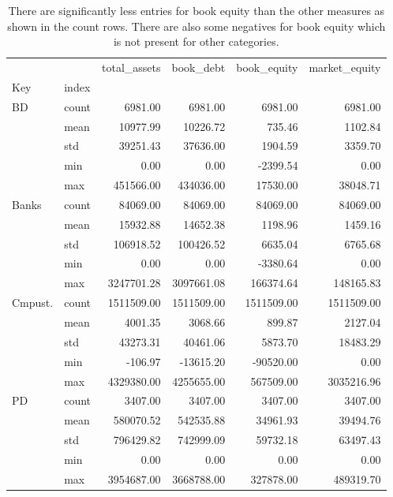 \begin{table}
\caption{There are significantly less entries for book equity than the other measures as shown in the count rows. There are also some negatives for book equity which is not present for other categories. }
\label{tab:Table 2.1}
\begin{tabular}{llrrrr}
\toprule
 &  & total_assets & book_debt & book_equity & market_equity \\
Key & index &  &  &  &  \\
\midrule
{BD} & count & 6981.00 & 6981.00 & 6981.00 & 6981.00 \\
 & mean & 10977.99 & 10226.72 & 735.46 & 1102.84 \\
 & std & 39251.43 & 37636.00 & 1904.59 & 3359.70 \\
 & min & 0.00 & 0.00 & -2399.54 & 0.00 \\
 & max & 451566.00 & 434036.00 & 17530.00 & 38048.71 \\
\cline{1-6}
{Banks} & count & 84069.00 & 84069.00 & 84069.00 & 84069.00 \\
 & mean & 15932.88 & 14652.38 & 1198.96 & 1459.16 \\
 & std & 106918.52 & 100426.52 & 6635.04 & 6765.68 \\
 & min & 0.00 & 0.00 & -3380.64 & 0.00 \\
 & max & 3247701.28 & 3097661.08 & 166374.64 & 148165.83 \\
\cline{1-6}
{Cmpust.} & count & 1511509.00 & 1511509.00 & 1511509.00 & 1511509.00 \\
 & mean & 4001.35 & 3068.66 & 899.87 & 2127.04 \\
 & std & 43273.31 & 40461.06 & 5873.70 & 18483.29 \\
 & min & -106.97 & -13615.20 & -90520.00 & 0.00 \\
 & max & 4329380.00 & 4255655.00 & 567509.00 & 3035216.96 \\
\cline{1-6}
{PD} & count & 3407.00 & 3407.00 & 3407.00 & 3407.00 \\
 & mean & 580070.52 & 542535.88 & 34961.93 & 39494.76 \\
 & std & 796429.82 & 742999.09 & 59732.18 & 63497.43 \\
 & min & 0.00 & 0.00 & 0.00 & 0.00 \\
 & max & 3954687.00 & 3668788.00 & 327878.00 & 489319.70 \\
\cline{1-6}
\bottomrule
\end{tabular}
\end{table}
